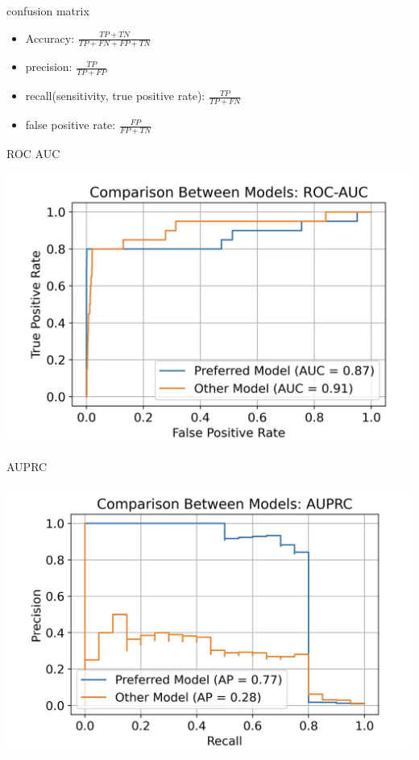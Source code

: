 \documentclass[
  ignorenonframetext,
]{beamer}
\begin{document}
\begin{frame}{confusion matrix}
  \begin{itemize}
    \item Accuracy: $\frac{TP+TN}{TP+FN+FP+TN}$
    \item precision: $\frac{TP}{TP+FP}$
    \item recall(sensitivity, true positive rate): $\frac{TP}{TP+FN}$
    \item false positive rate: $\frac{FP}{FP+TN}$
  \end{itemize}
\end{frame}


\begin{frame}{ROC AUC}
  \begin{center}
    \includegraphics{figure/pdf/roc_auc.png}
  \end{center}
\end{frame}


\begin{frame}{AUPRC}
  \begin{center}
    \includegraphics{figure/pdf/auprc.png}
  \end{center}
\end{frame}
\end{document}
